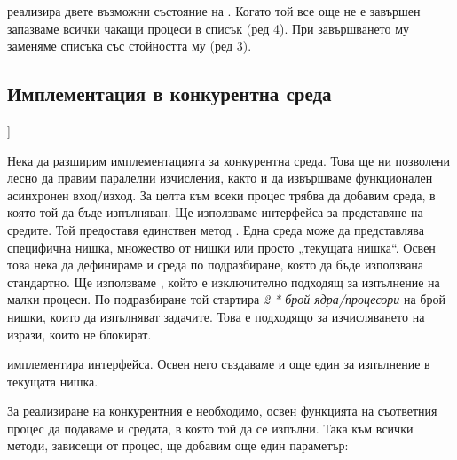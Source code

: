 

 реализира двете възможни състояние на . Когато той все още не е завършен запазваме всички чакащи процеси в списък (ред 4). При завършването му заменяме списъка със стойността му (ред 3).

\subsection{Имплементация в конкурентна среда}
\label{sec:concurrent-future-and-promise}]

Нека да разширим имплементацията за конкурентна среда. Това ще ни позволени лесно да правим паралелни изчисления, както и да извършваме функционален асинхронен вход/изход. За целта към всеки процес трябва да добавим среда, в която той да бъде изпълняван. Ще използваме интерфейса  за представяне на средите. Той предоставя единствен метод . Една среда може да представлява специфична нишка, множество от нишки или просто „текущата нишка“. Освен това нека да дефинираме и среда по подразбиране, която да бъде използвана стандартно. Ще използваме , който е изключително подходящ за изпълнение на малки процеси. По подразбиране той стартира \emph{2 * брой ядра/процесори} на брой нишки, които да изпълняват задачите. Това е подходящо за изчисляването на изрази, които не блокират.



 имплементира  интерфейса. Освен него създаваме и още един  за изпълнение в текущата нишка.

За реализиране на конкурентния  е необходимо, освен функцията на съответния процес да подаваме и средата, в която той да се изпълни. Така към всички методи, зависещи от процес, ще добавим още един параметър:

